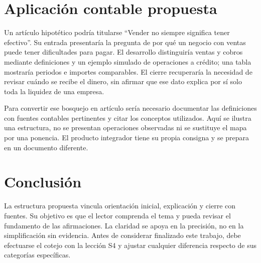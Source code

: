 \section{Aplicación contable propuesta}
Un artículo hipotético podría titularse \enquote{Vender no siempre significa tener efectivo}. Su entrada presentaría la pregunta de por qué un negocio con ventas puede tener dificultades para pagar. El desarrollo distinguiría ventas y cobros mediante definiciones y un ejemplo simulado de operaciones a crédito; una tabla mostraría periodos e importes comparables. El cierre recuperaría la necesidad de revisar cuándo se recibe el dinero, sin afirmar que ese dato explica por sí solo toda la liquidez de una empresa.

Para convertir ese bosquejo en artículo sería necesario documentar las definiciones con fuentes contables pertinentes y citar los conceptos utilizados. Aquí se ilustra una estructura, no se presentan operaciones observadas ni se sustituye el mapa por una ponencia. El producto integrador tiene su propia consigna y se prepara en un documento diferente.

\section{Conclusión}
La estructura propuesta vincula orientación inicial, explicación y cierre con fuentes. Su objetivo es que el lector comprenda el tema y pueda revisar el fundamento de las afirmaciones. La claridad se apoya en la precisión, no en la simplificación sin evidencia. Antes de considerar finalizado este trabajo, debe efectuarse el cotejo con la lección S4 y ajustar cualquier diferencia respecto de sus categorías específicas.

